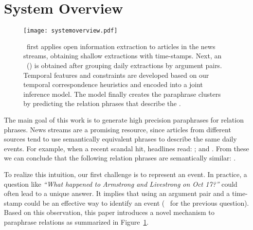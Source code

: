 
\section{System Overview}
\label{section_framework}
\begin{figure}
\centering
\texttt{[image: systemoverview.pdf]}
\caption{\sys\ first applies open information extraction to articles in the news
streams, obtaining shallow extractions with time-stamps. Next, an \Eec\ (\eec)
is obtained after grouping daily extractions by argument pairs. Temporal
features and constraints are developed based on our temporal correspondence
heuristics and encoded into a joint inference model. The model finally creates
the paraphrase clusters by predicting the relation phrases that describe the
\eec.
}

\label{systemoverview}
\end{figure}
The main goal of this work is to generate high precision paraphrases for
relation phrases. News streams are a promising resource, since articles
from different sources tend to use semantically equivalent phrases to
describe the same daily events. For example, when a recent scandal
hit, headlines read: ;
 and . From these we can conclude that the
following relation phrases are semantically similar: .

To realize this intuition, our first challenge is to represent an
event. In practice, a question like {\it ``What happened to Armstrong
  and Livestrong on Oct 17?''} could often lead to a unique
answer. It implies that using an argument pair and a time-stamp could
be an effective way to identify an event (\eg\  for the previous question). Based on this
observation, this paper introduces a novel mechanism to paraphrase
relations as summarized in Figure~\ref{systemoverview}.


